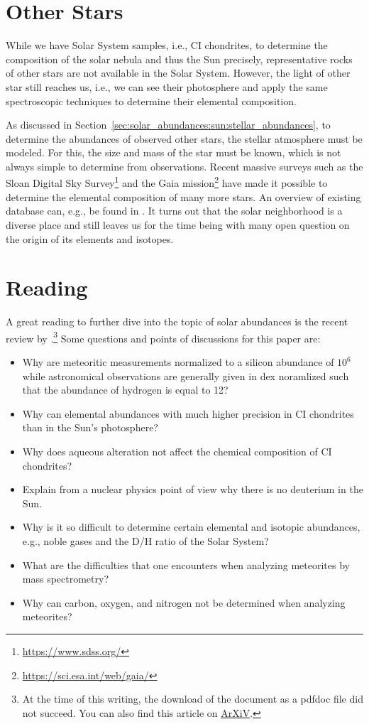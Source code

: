 \section{Other Stars}

While we have Solar System samples, i.e., CI chondrites, to determine the composition of the solar nebula and thus the Sun precisely, representative rocks of other stars are not available in the Solar System. However, the light of other star still reaches us, i.e., we can see their photosphere and apply the same spectroscopic techniques to determine their elemental composition. 

As discussed in Section~\ref{sec:solar_abundances:sun:stellar_abundances}, to determine the abundances of observed other stars, the stellar atmosphere must be modeled. For this, the size and mass of the star must be known, which is not always simple to determine from observations. Recent massive surveys such as the Sloan Digital Sky Survey\footnote{\url{https://www.sdss.org/}} and the Gaia mission\footnote{\url{https://sci.esa.int/web/gaia/}} have made it possible to determine the elemental composition of many more stars. An overview of existing database can, e.g., be found in \citet{allende-prieto16}. It turns out that the solar neighborhood is a diverse place \citep[see, e.g.,][]{bensby14} and still leaves us for the time being with many open question on the origin of its elements and isotopes.

\section{Reading}

A great reading to further dive into the topic of solar abundances is the recent review by \citet{lodders20}.\footnote{At the time of this writing, the download of the document as a \ac{pdfdoc} file did not succeed. You can also find this article on \href{https://arxiv.org/abs/1912.00844}{ArXiV}.} Some questions and points of discussions for this paper are:
\begin{itemize}
    \item Why are meteoritic measurements normalized to a silicon abundance of $10^6$ while astronomical observations are generally given in \ac{dex} noramlized such that the abundance of hydrogen is equal to 12?
    \item Why can elemental abundances with much higher precision in CI chondrites than in the Sun's photosphere?
    \item Why does aqueous alteration not affect the chemical composition of CI chondrites?
    \item Explain from a nuclear physics point of view why there is no deuterium in the Sun.
    \item Why is it so difficult to determine certain elemental and isotopic abundances, e.g., noble gases and the D/H ratio of the Solar System?
    \item What are the difficulties that one encounters when analyzing meteorites by mass spectrometry?
    \item Why can carbon, oxygen, and nitrogen not be determined when analyzing meteorites?
\end{itemize}